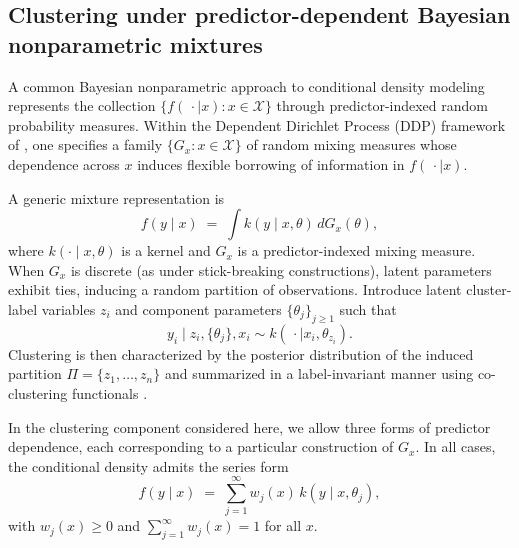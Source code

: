 \documentclass[article]{jss}\usepackage[]{graphicx}\usepackage[]{xcolor}
\begin{document}
\subsection{Clustering under predictor-dependent Bayesian nonparametric mixtures}
\label{subsec:clustering-theory}

A common Bayesian nonparametric approach to conditional density modeling
represents the collection $\{f(\,\cdot\mid x): x\in\mathcal{X}\}$
through predictor-indexed random probability measures. Within the
Dependent Dirichlet Process (DDP) framework of
\citet{MacEachern1999,MacEachern2000}, one specifies a family
$\{G_x: x\in\mathcal{X}\}$ of random mixing measures whose dependence
across $x$ induces flexible borrowing of information in
$f(\,\cdot\mid x)$.

A generic mixture representation is
\begin{equation}
f(y\mid x) \;=\; \int k\!\left(y\mid x,\theta\right)\, dG_x(\theta),
\label{eq:clust_mix_int}
\end{equation}
where $k(\cdot\mid x,\theta)$ is a kernel and $G_x$ is a
predictor-indexed mixing measure. When $G_x$ is discrete (as under
stick-breaking constructions), latent parameters exhibit ties, inducing
a random partition of observations. Introduce latent cluster-label
variables $z_i$ and component parameters $\{\theta_j\}_{j\ge1}$ such
that
\begin{equation}
y_i \mid z_i,\{\theta_j\},x_i \sim k\!\left(\,\cdot \mid x_i,\theta_{z_i}\right).
\label{eq:clust_latent}
\end{equation}
Clustering is then characterized by the posterior distribution of the
induced partition $\Pi=\{z_1,\ldots,z_n\}$ and summarized in a
label-invariant manner using co-clustering functionals
\citep{Binder1978,Dahl2006}.

In the clustering component considered here, we allow three forms of
predictor dependence, each corresponding to a particular construction of
$G_x$. In all cases, the conditional density admits the series form
\begin{equation}
f(y\mid x) \;=\; \sum_{j=1}^{\infty} w_j(x)\, k\!\left(y\mid x,\theta_j\right),
\label{eq:clust_series}
\end{equation}
with $w_j(x)\ge0$ and $\sum_{j=1}^{\infty} w_j(x)=1$ for all $x$.
\end{document}
